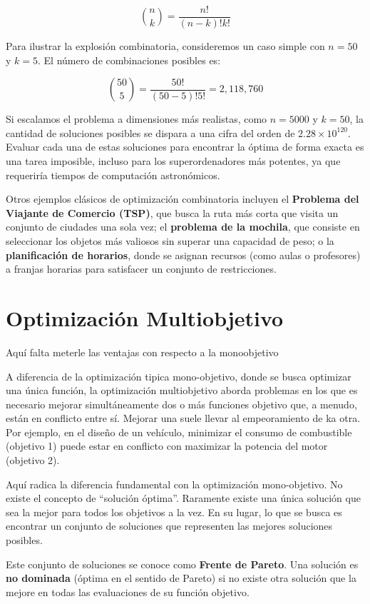 \documentclass[12pt,a4paper]{book}
\begin{document}
$$
    \binom{n}{k} = \frac{n!}{(n-k)!k!}
$$

Para ilustrar la explosión combinatoria, consideremos un caso simple con $n=50$ y $k=5$. El número de combinaciones posibles es:

$$
    \binom{50}{5} = \frac{50!}{(50-5)!5!} = 2,118,760
$$

Si escalamos el problema a dimensiones más realistas, como $n=5000$ y $k=50$, la cantidad de soluciones posibles se dispara a una cifra del orden de $2.28 \times 10^{120}$. Evaluar cada una de estas soluciones para encontrar la óptima de forma exacta es una tarea imposible, incluso para los superordenadores más potentes, ya que requeriría tiempos de computación astronómicos.

Otros ejemplos clásicos de optimización combinatoria incluyen el \textbf{Problema del Viajante de Comercio (TSP)}, que busca la ruta más corta que visita un conjunto de ciudades una sola vez; el \textbf{problema de la mochila}, que consiste en seleccionar los objetos más valiosos sin superar una capacidad de peso; o la \textbf{planificación de horarios}, donde se asignan recursos (como aulas o profesores) a franjas horarias para satisfacer un conjunto de restricciones.

\section{Optimización Multiobjetivo}

\color{red} Aquí falta meterle las ventajas con respecto a la monoobjetivo \color{black}

A diferencia de la optimización tipica mono-objetivo, donde se busca optimizar una única función, la optimización multiobjetivo aborda problemas en los que es necesario mejorar simultáneamente dos o más funciones objetivo que, a menudo, están en conflicto entre sí. Mejorar una suele llevar al empeoramiento de ka otra. Por ejemplo, en el diseño de un vehículo, minimizar el consumo de combustible (objetivo 1) puede estar en conflicto con maximizar la potencia del motor (objetivo 2).

Aquí radica la diferencia fundamental con la optimización mono-objetivo. No existe el concepto de ``solución óptima''. Raramente existe una única solución que sea la mejor para todos los objetivos a la vez. En su lugar, lo que se busca es encontrar un conjunto de soluciones que representen las mejores soluciones posibles.

Este conjunto de soluciones se conoce como \textbf{Frente de Pareto}. Una solución es \textbf{no dominada} (óptima en el sentido de Pareto) si no existe otra solución que la mejore en todas las evaluaciones de su función objetivo.
\end{document}
